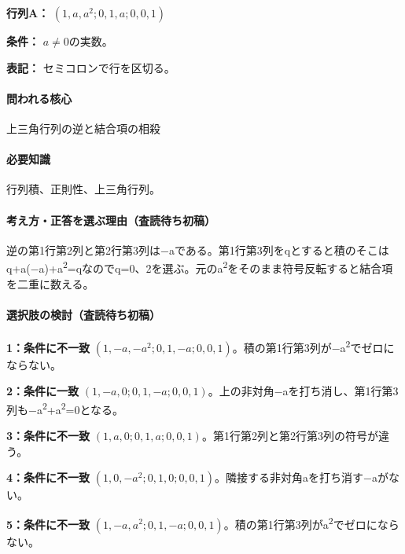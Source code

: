 \noindent\textbf{行列A：} \((1,a,a^2;0,1,a;0,0,1)\)\par

\noindent\textbf{条件：} \(a\neq0\)の実数。\par

\noindent\textbf{表記：} セミコロンで行を区切る。\par

\paragraph{問われる核心} 上三角行列の逆と結合項の相殺

\paragraph{必要知識} 行列積、正則性、上三角行列。

\paragraph{考え方・正答を選ぶ理由（査読待ち初稿）} 逆の第1行第2列と第2行第3列は−aである。第1行第3列をqとすると積のそこはq+a(−a)+a\textsuperscript{2}=qなのでq=\allowbreak{}0、2を選ぶ。元のa\textsuperscript{2}をそのまま符号反転すると結合項を二重に数える。

\paragraph{選択肢の検討（査読待ち初稿）}\mbox{}\par

\noindent\textbf{1：条件に不一致} \((1,-a,-a^2;0,1,-a;0,0,1)\)。積の第1行第3列が−a\textsuperscript{2}でゼロにならない。\par

\noindent\textbf{2：条件に一致} \((1,-a,0;0,1,-a;0,0,1)\)。上の非対角−aを打ち消し、第1行第3列も−a\textsuperscript{2}+a\textsuperscript{2}=0となる。\par

\noindent\textbf{3：条件に不一致} \((1,a,0;0,1,a;0,0,1)\)。第1行第2列と第2行第3列の符号が違う。\par

\noindent\textbf{4：条件に不一致} \((1,0,-a^2;0,1,0;0,0,1)\)。隣接する非対角aを打ち消す−aがない。\par

\noindent\textbf{5：条件に不一致} \((1,-a,a^2;0,1,-a;0,0,1)\)。積の第1行第3列がa\textsuperscript{2}でゼロにならない。\par

